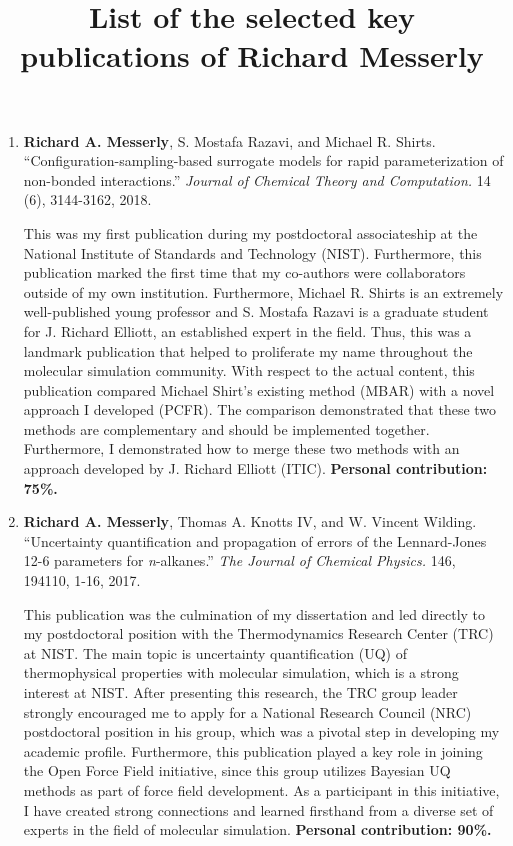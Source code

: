 \documentclass[12pt]{article}
\title{List of the selected key publications of Richard Messerly}
\date{}
\begin{document}
\maketitle


\begin{enumerate}
	
\item \textbf{Richard A. Messerly}, S. Mostafa Razavi, and Michael R. Shirts. ``Configuration-sampling-based surrogate models for rapid parameterization of non-bonded interactions.'' \textit{Journal of Chemical Theory and Computation.} 14 (6), 3144-3162, 2018.

This was my first publication during my postdoctoral associateship at the National Institute of Standards and Technology (NIST). Furthermore, this publication marked the first time that my co-authors were collaborators outside of my own institution. Furthermore, Michael R. Shirts is an extremely well-published young professor and S. Mostafa Razavi is a graduate student for J. Richard Elliott, an established expert in the field. Thus, this was a landmark publication that helped to proliferate my name throughout the molecular simulation community. With respect to the actual content, this publication compared Michael Shirt's existing method (MBAR) with a novel approach I developed (PCFR). The comparison demonstrated that these two methods are complementary and should be implemented together. Furthermore, I demonstrated how to merge these two methods with an approach developed by J. Richard Elliott (ITIC). \textbf{Personal contribution: 75\%.}

\item \textbf{Richard A. Messerly}, Thomas A. Knotts IV, and W. Vincent Wilding. ``Uncertainty quantification and propagation of errors of the Lennard-Jones 12-6 parameters for \textit{n}-alkanes.'' \textit{The Journal of Chemical Physics.} 146, 194110, 1-16, 2017.

This publication was the culmination of my dissertation and led directly to my postdoctoral position with the Thermodynamics Research Center (TRC) at NIST. The main topic is uncertainty quantification (UQ) of thermophysical properties with molecular simulation, which is a strong interest at NIST. After presenting this research, the TRC group leader strongly encouraged me to apply for a National Research Council (NRC) postdoctoral position in his group, which was a pivotal step in developing my academic profile. Furthermore, this publication played a key role in joining the Open Force Field initiative, since this group utilizes Bayesian UQ methods as part of force field development. As a participant in this initiative, I have created strong connections and learned firsthand from a diverse set of experts in the field of molecular simulation. \textbf{Personal contribution: 90\%.}


\end{enumerate}
\end{document}
